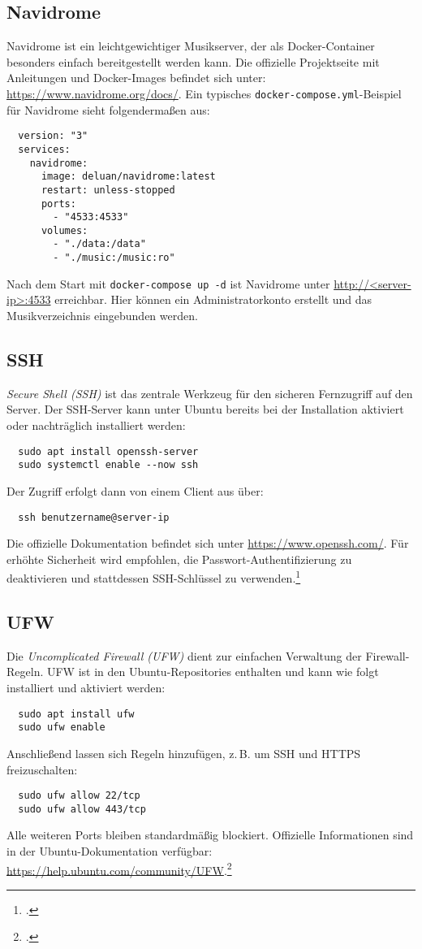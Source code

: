 \documentclass[12pt,a4paper]{report}
\begin{document}
  \subsection{Navidrome}  
  Navidrome ist ein leichtgewichtiger Musikserver, der als Docker-Container besonders einfach bereitgestellt werden kann.  
  Die offizielle Projektseite mit Anleitungen und Docker-Images befindet sich unter: \url{https://www.navidrome.org/docs/}.  
  Ein typisches \texttt{docker-compose.yml}-Beispiel für Navidrome sieht folgendermaßen aus:  
  \begin{verbatim}
  version: "3"
  services:
    navidrome:
      image: deluan/navidrome:latest
      restart: unless-stopped
      ports:
        - "4533:4533"
      volumes:
        - "./data:/data"
        - "./music:/music:ro"
  \end{verbatim}  
  Nach dem Start mit \texttt{docker-compose up -d} ist Navidrome unter \url{http://<server-ip>:4533} erreichbar.  
  Hier können ein Administratorkonto erstellt und das Musikverzeichnis eingebunden werden. 

  \subsection{SSH}  
  \emph{Secure Shell (SSH)} ist das zentrale Werkzeug für den sicheren Fernzugriff auf den Server.  
  Der SSH-Server kann unter Ubuntu bereits bei der Installation aktiviert oder nachträglich installiert werden:  
  \begin{verbatim}
  sudo apt install openssh-server
  sudo systemctl enable --now ssh
  \end{verbatim}  
  Der Zugriff erfolgt dann von einem Client aus über:  
  \begin{verbatim}
  ssh benutzername@server-ip
  \end{verbatim}  
  Die offizielle Dokumentation befindet sich unter \url{https://www.openssh.com/}.  
  Für erhöhte Sicherheit wird empfohlen, die Passwort-Authentifizierung zu deaktivieren und stattdessen SSH-Schlüssel zu verwenden.\footcite[Vgl.][Kapitel~22, S.~926~ff.]{nemeth_unixlinux}  

  \subsection{UFW}  
  Die \emph{Uncomplicated Firewall (UFW)} dient zur einfachen Verwaltung der Firewall-Regeln.  
  UFW ist in den Ubuntu-Repositories enthalten und kann wie folgt installiert und aktiviert werden:  
  \begin{verbatim}
  sudo apt install ufw
  sudo ufw enable
  \end{verbatim}  
  Anschließend lassen sich Regeln hinzufügen, z.\,B. um SSH und HTTPS freizuschalten:  
  \begin{verbatim}
  sudo ufw allow 22/tcp
  sudo ufw allow 443/tcp
  \end{verbatim}  
  Alle weiteren Ports bleiben standardmäßig blockiert.  
  Offizielle Informationen sind in der Ubuntu-Dokumentation verfügbar: \url{https://help.ubuntu.com/community/UFW}.\footcite[Vgl.][Kapitel~22, S.~932~ff.]{nemeth_unixlinux}  
\end{document}

